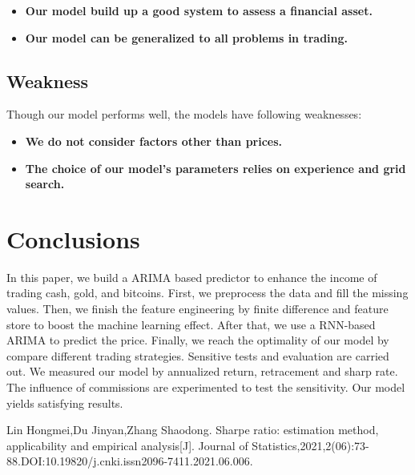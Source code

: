 \documentclass[12pt,a4paper]{article}
\newcommand{\Predictor}{ARIMA }
\begin{document}
\begin{spacing}{1.2}
\begin{itemize}
\item \textbf{Our model build up a good system to assess a financial asset.}

\item \textbf{Our model can be generalized to all problems in trading.}

\end{itemize}


\subsection{Weakness}

Though our model performs well, the models have following weaknesses:

\begin{itemize}
\item \textbf{We do not consider factors other than prices.}

\item \textbf{The choice of our model's parameters relies on experience and grid search.}
\end{itemize}


\section{Conclusions}
\label{Conclusions}

In this paper, we build a \Predictor based predictor to enhance the income of trading cash, gold, and bitcoins. First, we preprocess the data and fill the missing values. Then, we finish the feature engineering by finite difference and feature store to boost the machine learning effect. After that, we use a RNN-based \Predictor to predict the price. Finally, we reach the optimality of our model by compare different trading strategies. Sensitive tests and evaluation are carried out. We measured our model by annualized return, retracement and sharp rate. The influence of commissions are experimented to test the sensitivity. Our model yields satisfying results.




\newpage
\begin{thebibliography}{00}


Lin Hongmei,Du Jinyan,Zhang Shaodong. Sharpe ratio: estimation method, applicability and empirical analysis[J]. Journal of Statistics,2021,2(06):73-88.DOI:10.19820/j.cnki.issn2096-7411.2021.06.006.


\end{thebibliography}
\end{spacing}
\end{document}
